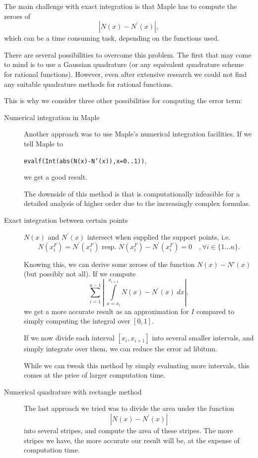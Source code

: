 \documentclass[a4paper, twoside]{article}
\begin{document}
The main challenge with exact integration is that Maple has to compute the zeroes of
\begin{equation*}
\left|N\left(x\right)-N^\prime\left(x\right)\right|,
\end{equation*}
which can be a time consuming task, depending on the functions used.

There are several possibilities to overcome this problem. The first that may come to mind is to use a Gaussian quadrature (or any equivalent quadrature scheme for rational functions). However, even after extensive research we could not find any suitable quadrature methods for rational functions.

This is why we consider three other possibilities for computing the error term:

\begin{description}
\item[Numerical integration in Maple] Another approach was to use Maple's numerical integration facilities. If we tell Maple to
  \begin{center}
    \texttt{evalf(Int(abs(N(x)-N'(x)),x=0..1))},
  \end{center}
  we get a good result.

  The downside of this method is that is computationally infeasible for a detailed analysis of higher order due to the increasingly complex formulas.
\item[Exact integration between certain points] $N\left(x\right)$ and $N^\prime\left(x\right)$ intersect when supplied the support points, i.e.\,
  \begin{equation*}
    N\left(x_i^F\right) = N^\prime\left(x_i^F\right) \text{ resp. } N\left( x_i^F \right) - N^\prime\left( x_i^F \right) = 0 \quad , \forall i \in \{1 \dots n\}.
  \end{equation*}

  Knowing this, we can derive some zeroes of the function $N(x)-N'(x)$ (but possibly not all). If we compute
  \begin{equation*}
    \sum\limits_{i=1}^{n-1} \left|\ \int\limits_{x=x_i}^{x_{i+1}} N\left(x\right) - N^\prime\left(x\right)\ dx \right|,
  \end{equation*}
  we get a more accurate result as an approximation for $I$ compared to simply computing the integral over $[0,1]$.

  If we now divide each interval $[x_i,x_{i+1}]$ into several smaller intervals, and simply integrate over them, we can reduce the error ad libitum.

  While we can tweak this method by simply evaluating more intervals, this comes at the price of larger computation time.
\item[Numerical quadrature with rectangle method] The last approach we tried was to divide the area under the function
  \begin{equation*}
    \left| N\left(x\right)-N^\prime\left(x\right) \right|
  \end{equation*}
  into several stripes, and compute the area of these stripes. The more stripes we have, the more accurate our result will be, at the expense of computation time.
\end{description}
\end{document}
